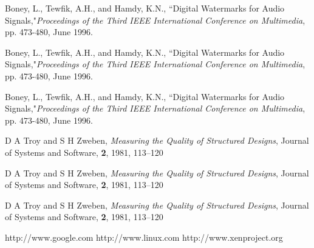 \documentclass[a4paper,twocolumn,10pt]{article}
\begin{document}
  
\begin{thebibliography}{100} %

 Boney, L., Tewfik, A.H., and Hamdy, K.N., ``Digital
Watermarks for Audio Signals,"\emph{Proceedings of the Third IEEE
International Conference on Multimedia}, pp. 473-480, June 1996.

 Boney, L., Tewfik, A.H., and Hamdy, K.N., ``Digital
Watermarks for Audio Signals,"\emph{Proceedings of the Third IEEE
International Conference on Multimedia}, pp. 473-480, June 1996.

 Boney, L., Tewfik, A.H., and Hamdy, K.N., ``Digital
Watermarks for Audio Signals,"\emph{Proceedings of the Third IEEE
International Conference on Multimedia}, pp. 473-480, June 1996.

  D A Troy and S H Zweben, {\em Measuring the Quality of
Structured Designs}, Journal of Systems and Software, {\bf 2}, 1981, 113--120

  D A Troy and S H Zweben, {\em Measuring the Quality of
Structured Designs}, Journal of Systems and Software, {\bf 2}, 1981, 113--120

  D A Troy and S H Zweben, {\em Measuring the Quality of
Structured Designs}, Journal of Systems and Software, {\bf 2}, 1981, 113--120

 http://www.google.com
 http://www.linux.com
 http://www.xenproject.org
\end{thebibliography}
  
  
  
\end{document}
